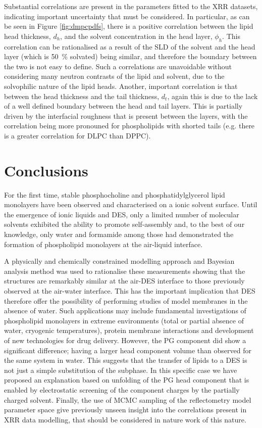 \documentclass[amsmath,amssymb,twocolumn,superscriptaddress]{revtex4-1}
\begin{document}
Substantial correlations are present in the parameters fitted to the XRR datasets, indicating important uncertainty that must be considered.
In particular, as can be seen in Figure \ref{fig:dmpcpdfs}, there is a positive correlation between the lipid head thickness, $d_h$, and the solvent concentration in the head layer, $\phi_h$.
This correlation can be rationalised as a result of the SLD of the solvent and the head layer (which is \SI{50}{\percent} solvated) being similar, and therefore the boundary between the two is not easy to define.
Such a correlations are unavoidable without considering many neutron contrasts of the lipid and solvent, due to the solvophilic nature of the lipid heads.
Another, important correlation is that between the head thickness and the tail thickness, $d_t$, again this is due to the lack of a well defined boundary between the head and tail layers.
This is partially driven by the interfacial roughness that is present between the layers, with the correlation being more pronouned for phospholipids with shorted tails (e.g. there is a greater correlation for DLPC than DPPC).

\section{Conclusions}
%
For the first time, stable phosphocholine and phosphatidylglycerol lipid monolayers have been observed and characterised on a ionic solvent surface.
Until the emergence of ionic liquids and DES, only a limited number of molecular solvents exhibited the ability to promote self-assembly and, to the best of our knowledge, only water and formamide among those had demonstrated the formation of phospholipid monolayers at the air-liquid interface.

A physically and chemically constrained modelling approach and Bayesian analysis method was used to rationalise these measurements showing that the structures are remarkably similar at the air-DES interface to those previously observed at the air-water interface.
This has the important implication that DES therefore offer the possibility of performing studies of model membranes in the absence of water.
Such applications may include fundamental investigations of phospholipid monolayers in extreme environments (total or partial absence of water, cryogenic temperatures), protein membrane interactions and development of new technologies for drug delivery.
However, the PG component did show a significant difference; having a larger head component volume than observed for the same system in water.
This suggests that the transfer of lipids to a DES is not just a simple substitution of the subphase.
In this specific case we have proposed an explanation based on unfolding of the PG head component that is enabled by electrostatic screening of the component charges by the partially charged solvent.
Finally, the use of MCMC sampling of the reflectometry model parameter space give previously unseen insight into the correlations present in XRR data modelling, that should be considered in nature work of this nature.
\end{document}
